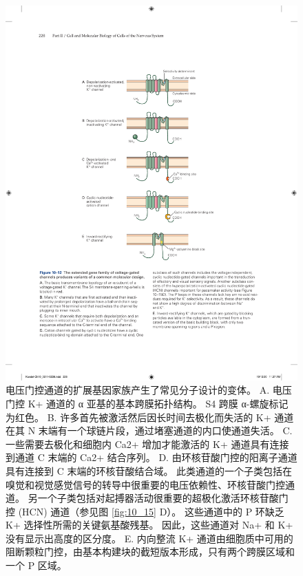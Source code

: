 \begin{figure}[htbp]
	\centering
	\includegraphics[width=0.6\linewidth]{chap10/fig_10_12}
	\caption{电压门控通道的扩展基因家族产生了常见分子设计的变体。 A. 电压门控 K+ 通道的 α 亚基的基本跨膜拓扑结构。 S4 跨膜 α-螺旋标记为红色。 B. 许多首先被激活然后因长时间去极化而失活的 K+ 通道在其 N 末端有一个球链片段，通过堵塞通道的内口使通道失活。 C. 一些需要去极化和细胞内 Ca2+ 增加才能激活的 K+ 通道具有连接到通道 C 末端的 Ca2+ 结合序列。 D. 由环核苷酸门控的阳离子通道具有连接到 C 末端的环核苷酸结合域。 此类通道的一个子类包括在嗅觉和视觉感觉信号的转导中很重要的电压依赖性、环核苷酸门控通道。 另一个子类包括对起搏器活动很重要的超极化激活环核苷酸门控 (HCN) 通道（参见图 \ref{fig:10_15} D）。 这些通道中的 P 环缺乏 K+ 选择性所需的关键氨基酸残基。 因此，这些通道对 Na+ 和 K+ 没有显示出高度的区分度。 E. 内向整流 K+ 通道由细胞质中可用的阻断颗粒门控，由基本构建块的截短版本形成，只有两个跨膜区域和一个 P 区域。}
	\label{fig:10_12}
\end{figure}

